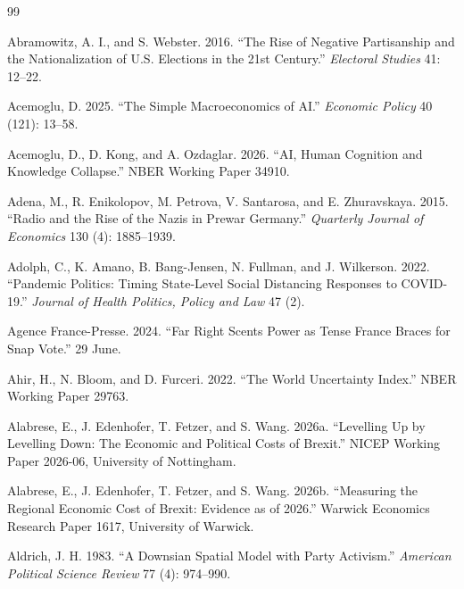\documentclass[12pt,letterpaper]{article}
\begin{document}
\clearpage
\begin{thebibliography}{99}
\setlength{\itemsep}{2pt}

Abramowitz, A. I., and S. Webster. 2016. ``The Rise of Negative Partisanship and the Nationalization of U.S. Elections in the 21st Century.'' \textit{Electoral Studies} 41: 12--22.

Acemoglu, D. 2025. ``The Simple Macroeconomics of AI.'' \textit{Economic Policy} 40 (121): 13--58.

Acemoglu, D., D. Kong, and A. Ozdaglar. 2026. ``AI, Human Cognition and Knowledge Collapse.'' NBER Working Paper 34910.

Adena, M., R. Enikolopov, M. Petrova, V. Santarosa, and E. Zhuravskaya. 2015. ``Radio and the Rise of the Nazis in Prewar Germany.'' \textit{Quarterly Journal of Economics} 130 (4): 1885--1939.

Adolph, C., K. Amano, B. Bang-Jensen, N. Fullman, and J. Wilkerson. 2022. ``Pandemic Politics: Timing State-Level Social Distancing Responses to COVID-19.'' \textit{Journal of Health Politics, Policy and Law} 47 (2).

Agence France-Presse. 2024. ``Far Right Scents Power as Tense France Braces for Snap Vote.'' 29 June.

Ahir, H., N. Bloom, and D. Furceri. 2022. ``The World Uncertainty Index.'' NBER Working Paper 29763.

Alabrese, E., J. Edenhofer, T. Fetzer, and S. Wang. 2026a. ``Levelling Up by Levelling Down: The Economic and Political Costs of Brexit.'' NICEP Working Paper 2026-06, University of Nottingham.

Alabrese, E., J. Edenhofer, T. Fetzer, and S. Wang. 2026b. ``Measuring the Regional Economic Cost of Brexit: Evidence as of 2026.'' Warwick Economics Research Paper 1617, University of Warwick.

Aldrich, J. H. 1983. ``A Downsian Spatial Model with Party Activism.'' \textit{American Political Science Review} 77 (4): 974--990.


\end{thebibliography}
\end{document}

